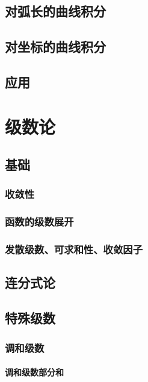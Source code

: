 \documentclass[UTF8]{../../09-Mathematics}
\begin{document}
\section{对弧长的曲线积分}
\section{对坐标的曲线积分}


\section{应用}




\chapter{级数论}

\section{基础}



\subsection{收敛性}
\subsection{函数的级数展开}

\subsection{发散级数、可求和性、收敛因子}



\section{连分式论}



\section{特殊级数}


\subsection{调和级数}

\subsubsection{调和级数部分和}
\end{document}
